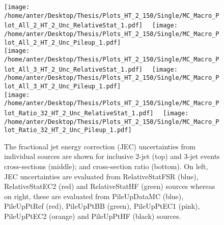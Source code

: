 \begin{figure}[!hbtp]
\hspace*{-5mm}\texttt{[image: /home/anter/Desktop/Thesis/Plots\_HT\_2\_150/Single/MC\_Macro\_Plot\_All\_2\_HT\_2\_Unc\_RelativeStat\_1.pdf]}%
~~\texttt{[image: /home/anter/Desktop/Thesis/Plots\_HT\_2\_150/Single/MC\_Macro\_Plot\_All\_2\_HT\_2\_Unc\_Pileup\_1.pdf]}\\
\hspace*{-5mm}\texttt{[image: /home/anter/Desktop/Thesis/Plots\_HT\_2\_150/Single/MC\_Macro\_Plot\_All\_3\_HT\_2\_Unc\_RelativeStat\_1.pdf]}%
~~\texttt{[image: /home/anter/Desktop/Thesis/Plots\_HT\_2\_150/Single/MC\_Macro\_Plot\_All\_3\_HT\_2\_Unc\_Pileup\_1.pdf]}\\
\hspace*{-5mm}\texttt{[image: /home/anter/Desktop/Thesis/Plots\_HT\_2\_150/Single/MC\_Macro\_Plot\_Ratio\_32\_HT\_2\_Unc\_RelativeStat\_1.pdf]}%
~~\texttt{[image: /home/anter/Desktop/Thesis/Plots\_HT\_2\_150/Single/MC\_Macro\_Plot\_Ratio\_32\_HT\_2\_Unc\_Pileup\_1.pdf]}
\caption[The fractional jet energy correction (JEC) uncertainties from individual sources (Part III).]{The fractional jet energy correction (JEC) uncertainties from individual sources are shown for inclusive 2-jet (top) and 3-jet events cross-sections (middle); and cross-section ratio \ratio (bottom). On left, JEC uncertainties are evaluated from RelativeStatFSR (blue), RelativeStatEC2 (red) and RelativeStatHF (green) sources whereas on right, these are evaluated from PileUpDataMC (blue), PileUpPtRef (red), PileUpPtBB (green), PileUpPtEC1 (pink), PileUpPtEC2 (orange) and PileUpPtHF (black) sources.}
\label{fig:jes3}
\end{figure}


